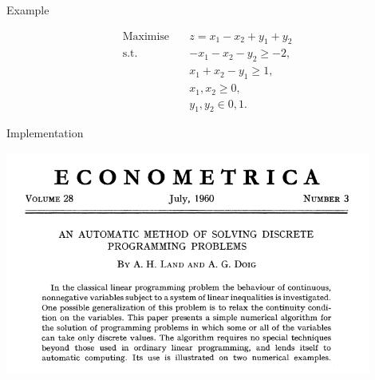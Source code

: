 \newpage



\begin{bclogo}[logo=\bccrayon]{\small Example }
\vspace{.2cm} \small

\begin{align*}
\textrm{Maximise} \quad & z = x_1 - x_2 + y_1 + y_2 \\
\textrm{s.t.} \quad & -x_1 - x_2 - y_2 \geq -2, \\
& x_1 +  x_2 - y_1 \geq 1, \\
& x_1, x_2 \geq 0, \\
& y_1, y_2 \in {0,1}.
\end{align*}


\vspace{.2cm}
\end{bclogo}
\vspace{1cm}


\begin{bclogo}[logo=\bcinfo, barre=none ]{\small Implementation}
\vspace{0.2cm}

\end{bclogo}



\newpage


\begin{center}
\centering
\includegraphics[width=12cm]{fig/econometrica.png}
\end{center}



